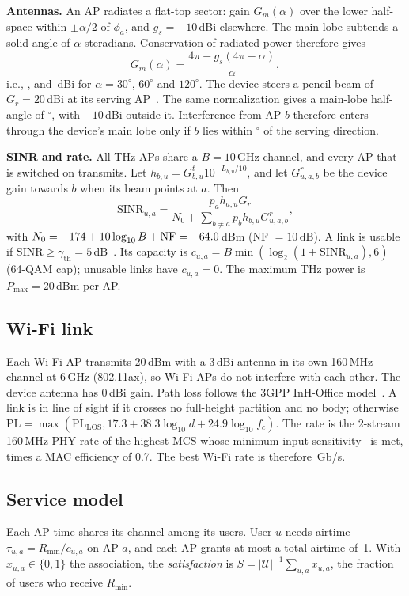\documentclass[conference]{IEEEtran}
\newcommand{\Rmin}{R_{\min}}
\newcommand{\Pmax}{P_{\max}}
\begin{document}
\textbf{Antennas.}
An AP radiates a flat-top sector: gain $G_m(\alpha)$ over the lower half-space within $\pm\alpha/2$ of $\phi_a$, and $g_s=-10$\,dBi elsewhere.
The main lobe subtends a solid angle of $\alpha$ steradians.
Conservation of radiated power therefore gives
\begin{equation}
G_m(\alpha)=\frac{4\pi-g_s(4\pi-\alpha)}{\alpha},\label{eq:gain}
\end{equation}
i.e., \GainThirty, \GainSixty{} and \GainOneTwenty\,dBi for $\alpha=30^\circ$, $60^\circ$ and $120^\circ$.
The device steers a pencil beam of $G_r=20$\,dBi at its serving AP~\cite{rappaport2019above100}.
The same normalization gives a main-lobe half-angle of \UePsi$^\circ$, with $-10$\,dBi outside it.
Interference from AP $b$ therefore enters through the device's main lobe only if $b$ lies within \UePsi$^\circ$ of the serving direction.

\textbf{SINR and rate.}
All THz APs share a $B=10$\,GHz channel, and every AP that is switched on transmits.
Let $h_{b,u}=G^t_{b,u}10^{-L_{b,u}/10}$, and let $G^r_{u,a,b}$ be the device gain towards $b$ when its beam points at $a$.
Then
\begin{equation}
\mathrm{SINR}_{u,a}=\frac{p_a h_{a,u} G_r}{N_0+\sum_{b\ne a}p_b h_{b,u}G^r_{u,a,b}},\label{eq:sinr}
\end{equation}
with $N_0=-174+10\log_{10}B+\mathrm{NF}=-64.0$\,dBm (NF $=10$\,dB).
A link is usable if $\mathrm{SINR}\ge\gamma_{\text{th}}=5$\,dB~\cite{anon2026teramove}.
Its capacity is $c_{u,a}=B\min(\log_2(1+\mathrm{SINR}_{u,a}),6)$ (64-QAM cap); unusable links have $c_{u,a}=0$.
The maximum THz power is $\Pmax=20$\,dBm per AP.

\subsection{Wi-Fi link}
Each Wi-Fi AP transmits 20\,dBm with a 3\,dBi antenna in its own 160\,MHz channel at 6\,GHz (802.11ax), so Wi-Fi APs do not interfere with each other.
The device antenna has 0\,dBi gain.
Path loss follows the 3GPP InH-Office model~\cite{3gpp38901}.
A link is in line of sight if it crosses no full-height partition and no body; otherwise $\mathrm{PL}=\max(\mathrm{PL}_{\text{LOS}},17.3+38.3\log_{10}d+24.9\log_{10}f_c)$.
The rate is the 2-stream 160\,MHz PHY rate of the highest MCS whose minimum input sensitivity~\cite{ieee80211ax} is met, times a MAC efficiency of 0.7.
The best Wi-Fi rate is therefore \WifiMaxRate\,Gb/s.

\subsection{Service model}
Each AP time-shares its channel among its users.
User $u$ needs airtime $\tau_{u,a}=\Rmin/c_{u,a}$ on AP $a$, and each AP grants at most a total airtime of~1.
With $x_{u,a}\in\{0,1\}$ the association, the \emph{satisfaction} is $S=|\mathcal{U}|^{-1}\sum_{u,a}x_{u,a}$, the fraction of users who receive $\Rmin$.
\end{document}
